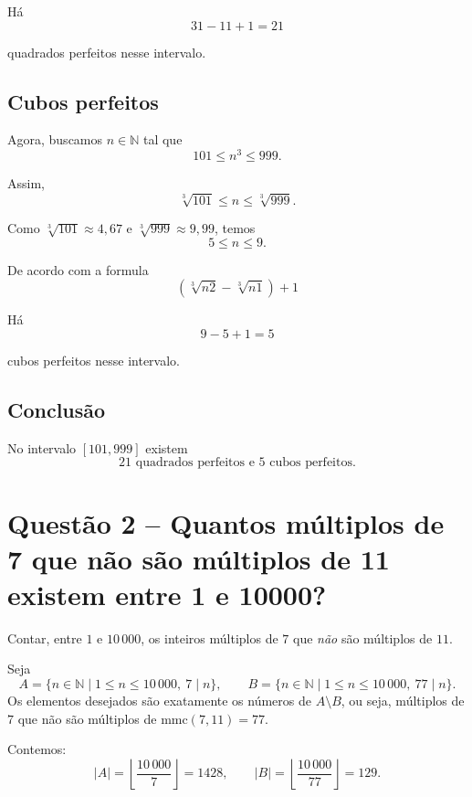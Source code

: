 \documentclass[12pt,a4paper]{article}
\begin{document}
    Há
    \[
    31 - 11 + 1 = 21
    \]

    quadrados perfeitos nesse intervalo.

    \subsection*{Cubos perfeitos}

    Agora, buscamos $n \in \mathbb{N}$ tal que
    \[
    101 \leq n^3 \leq 999.
    \]

    Assim,
    \[
    \sqrt[3]{101} \leq n \leq \sqrt[3]{999}.
    \]

    Como $\sqrt[3]{101} \approx 4{,}67$ e $\sqrt[3]{999} \approx 9{,}99$, temos
    \[
    5 \leq n \leq 9.
    \]

    De acordo com a formula
    \[
    \boxed{\left(\sqrt[3]{n2} - \sqrt[3]{n1}\right) + 1}
    \]

    Há
    \[
    9 - 5 + 1 = 5
    \]
    
    cubos perfeitos nesse intervalo.

    \subsection*{Conclusão}

    No intervalo $[101,999]$ existem
    \[
    \boxed{21 \text{ quadrados perfeitos e } 5 \text{ cubos perfeitos}.}
    \]


\section*{Questão 2 -- Quantos múltiplos de 7 que não são múltiplos de 11 existem entre 1 e 10000?}

    Contar, entre $1$ e $10\,000$, os inteiros múltiplos de $7$ que \emph{não} são múltiplos de $11$.

    \vspace{0.5cm}

    Seja
    \[
    A=\{n\in\mathbb{N}\mid 1\le n\le 10\,000,\ 7\mid n\},\qquad
    B=\{n\in\mathbb{N}\mid 1\le n\le 10\,000,\ 77\mid n\}.
    \]
    Os elementos desejados são exatamente os números de $A\setminus B$, ou seja, múltiplos de $7$ que não são múltiplos de $\mathrm{mmc}(7,11)=77$.

    \vspace{0.5cm}

    Contemos:
    \[
    |A|=\left\lfloor\frac{10\,000}{7}\right\rfloor=1428,\qquad
    |B|=\left\lfloor\frac{10\,000}{77}\right\rfloor=129.
    \]
\end{document}

